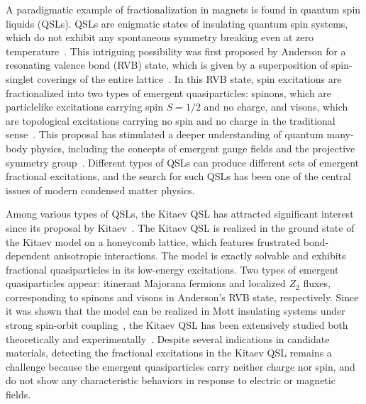 \documentclass[twocolumn,superscriptaddress,showpacs, longbibliography, aps, prx]{revtex4-2}
\begin{document}
A paradigmatic example of fractionalization in magnets is found in quantum spin liquids (QSLs). 
QSLs are enigmatic states of insulating quantum spin systems, which do not exhibit any spontaneous symmetry breaking even at zero temperature~\cite{Anderson1973, Wen1991, Kitaev2006, Balents2010}. 
This intriguing possibility was first proposed by Anderson for a resonating valence bond (RVB) state, which is given by a superposition of spin-singlet coverings of the entire lattice~\cite{Anderson1973}.
In this RVB state, spin excitations are fractionalized into two types of emergent quasiparticles: spinons, which are particlelike excitations carrying spin $S=1/2$ and no charge, and visons, which are topological excitations carrying no spin and no charge in the traditional sense~\cite{Wen2007Book, SenthilF2000}.
This proposal has stimulated a deeper understanding of quantum many-body physics, including the concepts of emergent gauge fields and the projective symmetry group~\cite{SenthilF2000,Wen2002,Wen2003}. 
Different types of QSLs can produce different sets of emergent fractional excitations, and the search for such QSLs has been one of the central issues of modern condensed matter physics. 

Among various types of QSLs, the Kitaev QSL has attracted significant interest since its proposal by Kitaev~\cite{Kitaev2006}. 
The Kitaev QSL is realized in the ground state of the Kitaev model on a honeycomb lattice, which features frustrated bond-dependent anisotropic interactions. 
The model is exactly solvable and exhibits fractional quasiparticles in its low-energy excitations. 
Two types of emergent quasiparticles appear: itinerant Majorana fermions and localized $Z_2$ fluxes, corresponding to spinons and visons in Anderson's RVB state, respectively.
Since it was shown that the model can be realized in Mott insulating systems under strong spin-orbit coupling~\cite{Jackeli_PRL2009}, the Kitaev QSL has been extensively studied both theoretically and experimentally~\cite{WinterTDBSGV2017, TakagiTJKN2019, KnolleM2019, JanssenV2019, Motome_JPSJ2020, TrebstH2022, RousochatzakisPLK2024}. 
Despite several indications in candidate materials, detecting the fractional excitations in the Kitaev QSL remains a challenge because the emergent quasiparticles carry neither charge nor spin, and do not show any characteristic behaviors in response to electric or magnetic fields.  
\end{document}
